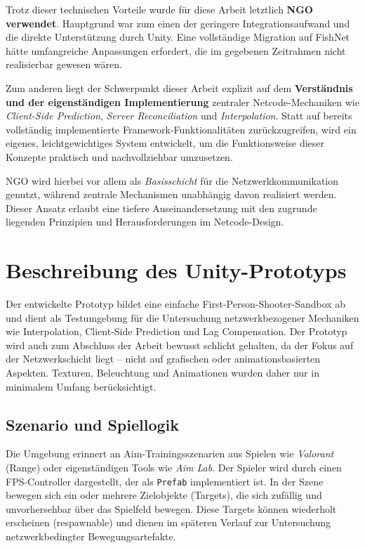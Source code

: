 \documentclass{article}
\begin{document}
Trotz dieser technischen Vorteile wurde für diese Arbeit letztlich \textbf{NGO verwendet}. Hauptgrund war zum einen der geringere Integrationsaufwand und die direkte Unterstützung durch Unity. Eine vollständige Migration auf FishNet hätte umfangreiche Anpassungen erfordert, die im gegebenen Zeitrahmen nicht realisierbar gewesen wären.

Zum anderen liegt der Schwerpunkt dieser Arbeit explizit auf dem \textbf{Verständnis und der eigenständigen Implementierung} zentraler Netcode-Mechaniken wie \textit{Client-Side Prediction}, \textit{Server Reconciliation} und \textit{Interpolation}. Statt auf bereits vollständig implementierte Framework-Funktionalitäten zurückzugreifen, wird ein eigenes, leichtgewichtiges System entwickelt, um die Funktionsweise dieser Konzepte praktisch und nachvollziehbar umzusetzen.

NGO wird hierbei vor allem als \textit{Basisschicht} für die Netzwerkkommunikation genutzt, während zentrale Mechanismen unabhängig davon realisiert werden. Dieser Ansatz erlaubt eine tiefere Auseinandersetzung mit den zugrunde liegenden Prinzipien und Herausforderungen im Netcode-Design.

\newpage

\section{Beschreibung des Unity-Prototyps}
\label{sec:prototyp}

Der entwickelte Prototyp bildet eine einfache First-Person-Shooter-Sandbox ab und dient als Testumgebung für die Untersuchung netzwerkbezogener Mechaniken wie Interpolation, Client-Side Prediction und Lag Compensation. Der Prototyp wird auch zum Abschluss der Arbeit bewusst schlicht gehalten, da der Fokus auf der Netzwerkschicht liegt – nicht auf grafischen oder animationsbasierten Aspekten. Texturen, Beleuchtung und Animationen wurden daher nur in minimalem Umfang berücksichtigt.

\subsection{Szenario und Spiellogik}
Die Umgebung erinnert an Aim-Trainingsszenarien aus Spielen wie \textit{Valorant} (Range) oder eigenständigen Tools wie \textit{Aim Lab}. Der Spieler wird durch einen FPS-Controller dargestellt, der als \texttt{Prefab} implementiert ist. In der Szene bewegen sich ein oder mehrere Zielobjekte (Targets), die sich zufällig und unvorhersehbar über das Spielfeld bewegen. Diese Targets können wiederholt erscheinen (respawnable) und dienen im späteren Verlauf zur Untersuchung netzwerkbedingter Bewegungsartefakte.
\end{document}
